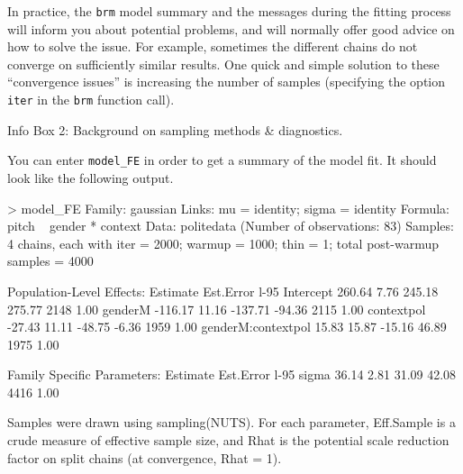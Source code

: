 \documentclass[nobib]{tufte-handout}
\begin{document}
\begin{InfoBox}[]
{\begin{minipage}{1\textwidth}
    \medskip
  
    In practice, the \texttt{brm} model summary and the messages during the fitting process will inform you about potential problems, and will normally offer good advice on how to solve the issue. 
   For example, sometimes the different chains do not converge on sufficiently similar results. 
    One quick and simple solution to these ``convergence issues'' is increasing the number of samples (specifying the option \texttt{iter} in the \texttt{brm} function call).
   
  \end{minipage} \par
  } \par
  \begin{center}
    Info Box 2: Background on sampling methods \& diagnostics.
  \end{center}
\end{InfoBox}


You can enter \texttt{model\_FE} in order to get a summary of the model fit. It should look like the following output.

\bigskip

\begin{minipage}[]{1.2\textwidth}
\begin{rc}
> model_FE
 Family: gaussian 
  Links: mu = identity; sigma = identity 
Formula: pitch ~ gender * context 
   Data: politedata (Number of observations: 83) 
Samples: 4 chains, each with iter = 2000; warmup = 1000; thin = 1;
         total post-warmup samples = 4000

Population-Level Effects: 
                   Estimate Est.Error l-95%
Intercept            260.64      7.76   245.18   275.77       2148 1.00
genderM             -116.17     11.16  -137.71   -94.36       2115 1.00
contextpol           -27.43     11.11   -48.75    -6.36       1959 1.00
genderM:contextpol    15.83     15.87   -15.16    46.89       1975 1.00

Family Specific Parameters: 
      Estimate Est.Error l-95%
sigma    36.14      2.81    31.09    42.08       4416 1.00

Samples were drawn using sampling(NUTS). For each parameter, Eff.Sample 
is a crude measure of effective sample size, and Rhat is the potential 
scale reduction factor on split chains (at convergence, Rhat = 1).
\end{rc}
\end{minipage}
\end{document}
